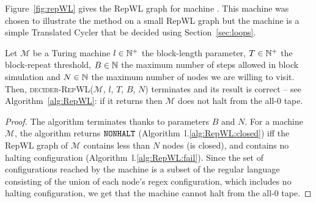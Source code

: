 \begin{example}
    Figure~\ref{fig:repWL} gives the RepWL graph for machine . This machine was chosen to illustrate the method on a small RepWL graph but the machine is a simple Translated Cycler that be decided using Section~\ref{sec:loops}.
\end{example}


\begin{theorem}\label{th:repwl}
    Let $\mathcal{M}$ be a Turing machine $l\in \mathbb{N}^+$ the block-length parameter, $T \in \mathbb{N}^+$ the block-repeat threshold, $B \in \mathbb{N}$ the maximum number of steps allowed in block simulation and $N \in \mathbb{N}$ the maximum number of nodes we are willing to visit. Then, \textsc{decider-RepWL}($\mathcal{M}$, $l$, $T$, $B$, $N$) terminates and its result is correct -- see Algorithm~\ref{alg:RepWL}: if it returns \NONHALT then $\mathcal{M}$ does not halt from the all-$0$ tape.
\end{theorem}
\begin{proof}
    The algorithm terminates thanks to parameters $B$ and $N$. For a machine $\mathcal{M}$, the algorithm returns $\texttt{NONHALT}$ (Algorithm~l.\ref{alg:RepWL:closed}) iff the RepWL graph of $\mathcal{M}$ contains less than $N$ nodes (\ie is closed), and contains no halting configuration (Algorithm~l.\ref{alg:RepWL:fail}). Since the set of configurations reached by the machine is a subset of the regular language consisting of the union of each node's regex configuration, which includes no halting configuration, we get that the machine cannot halt from the all-0 tape.
\end{proof}


